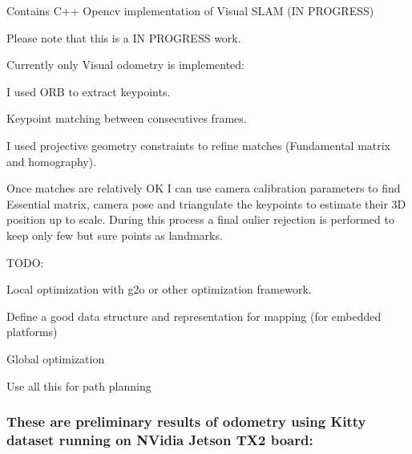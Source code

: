 Contains C++ Opencv implementation of Visual S\+L\+AM (IN P\+R\+O\+G\+R\+E\+SS)

Please note that this is a IN P\+R\+O\+G\+R\+E\+SS work.

Currently only Visual odometry is implemented\+:
\begin{DoxyItemize}
\item I used O\+RB to extract keypoints.
\item Keypoint matching between consecutives frames.
\item I used projective geometry constraints to refine matches (Fundamental matrix and homography).
\item Once matches are relatively OK I can use camera calibration parameters to find Essential matrix, camera pose and triangulate the keypoints to estimate their 3D position up to scale. During this process a final oulier rejection is performed to keep only few but sure points as landmarks.
\end{DoxyItemize}

T\+O\+DO\+:
\begin{DoxyItemize}
\item Local optimization with g2o or other optimization framework.
\item Define a good data structure and representation for mapping (for embedded platforms)
\item Global optimization
\item Use all this for path planning
\end{DoxyItemize}

\subsubsection*{These are preliminary results of odometry using Kitty dataset running on N\+Vidia Jetson T\+X2 board\+:}

 